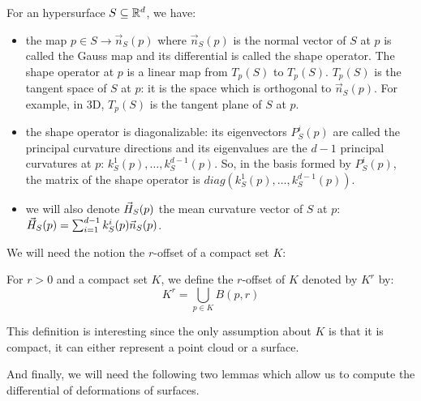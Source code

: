 \begin{definition}
    For an hypersurface $ S \subseteq \mathbb{R}^d $, we have:

   \begin{itemize}
       \item the map $ p \in S \rightarrow \vec{n}_S(p) $ where $ \vec{n}_S(p)
           $ is the normal vector of $ S $ at $ p $ is called the Gauss map
           and its differential is called the shape operator. The shape operator
           at $ p $ is a linear map from $ T_p(S) $ to $ T_p(S) $. $ T_p(S) $ is
           the tangent space of $ S $ at $ p $: it is the space which is
           orthogonal to $ \vec{n}_S(p) $. For example, in 3D, $ T_p(S) $ is the
           tangent plane of $ S $ at $ p $.

       \item the shape operator is diagonalizable: its eigenvectors $ P_S^i(p) $
           are called the principal curvature directions and its eigenvalues are
           the $ d-1 $ principal curvatures at $ p $: $ k^1_S(p), \ldots,
           k^{d-1}_S(p) $. So, in the basis formed by $ P_S^i(p) $, the
           matrix of the shape operator is $ diag(k^1_S(p), \ldots,
           k^{d-1}_S(p)) $.

       \item we will also denote $ \vec{H}_{S}(p) $ the mean curvature vector of $
           S $ at $ p $: $ \vec{H}_{S}(p) = \sum_{i=1}^{d-1} k^i_S(p)
           \vec{n}_S(p) $.
   \end{itemize}

   \label{prop:curvatures-surface}
\end{definition}

We will need the notion the $r$-offset of a compact set $ K $:

\begin{definition}
    For $ r > 0 $ and a compact set $ K $, we define the $r$-offset of $ K $
    denoted by $ K^r $ by:
    $$ K^r = \bigcup_{p \in K} B(p, r) $$
\end{definition}

This definition is interesting since the only assumption about $ K $ is that it
is compact, it can either represent a point cloud or a surface.

And finally, we will need the following two lemmas which allow us to compute the
differential of deformations of surfaces.

